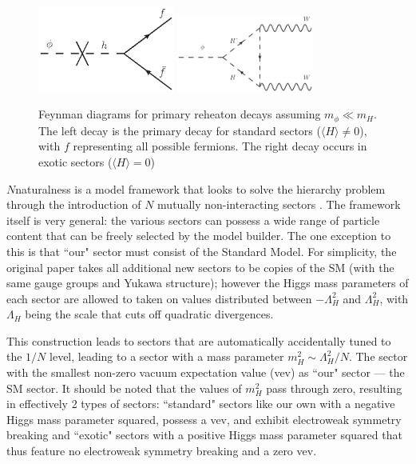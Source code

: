 \documentclass[nofootinbib,twocolumn,preprintnumbers]{revtex4-2}
\begin{document}
\begin{figure}[tb]
\centering
\begin{minipage}[c]{\textwidth}
\includegraphics[width=0.4\textwidth]{standardDecay.eps}
\includegraphics[width=0.4\textwidth]{exoticDecay.eps}
\end{minipage}
\hfill
\caption{Feynman diagrams for primary reheaton decays assuming $m_{\phi} \ll m_H$. The left decay is the primary decay for standard sectors ($\langle H\rangle\neq 0$), with $f$ representing all possible fermions. The right decay occurs in exotic sectors ($\langle H\rangle = 0$)
}
\label{fig:reheatonDecays}
\end{figure}

$N$naturalness is a model framework that looks to solve the hierarchy problem through the introduction of $N$ mutually non-interacting sectors \cite{Arkani-Hamed:2016rle}. The framework itself is very general: the various sectors can possess a wide range of particle content that can be freely selected by the model builder. The one exception to this is that ``our" sector must consist of the Standard Model. For simplicity, the original paper takes all additional new sectors to be copies of the SM (with the same gauge groups and Yukawa structure); however the Higgs mass parameters of each sector are allowed to taken on values distributed between $-\Lambda_H^2$ and $\Lambda^2_H$, with $\Lambda_H$ being the scale that cuts off quadratic divergences.

This construction leads to sectors that are automatically accidentally tuned to the $1/N$ level, leading to a sector with a mass parameter $m_H^2 \sim \Lambda_H^2/N$. The sector with the smallest non-zero vacuum expectation value (vev) as ``our" sector --- the SM sector. It should be noted that the values of $m_H^2$ pass through zero, resulting in effectively 2 types of sectors: ``standard" sectors like our own with a negative Higgs mass parameter squared, possess a vev, and exhibit electroweak symmetry breaking and ``exotic" sectors with a positive Higgs mass parameter squared that thus feature no electroweak symmetry breaking and a zero vev. 
\end{document}
